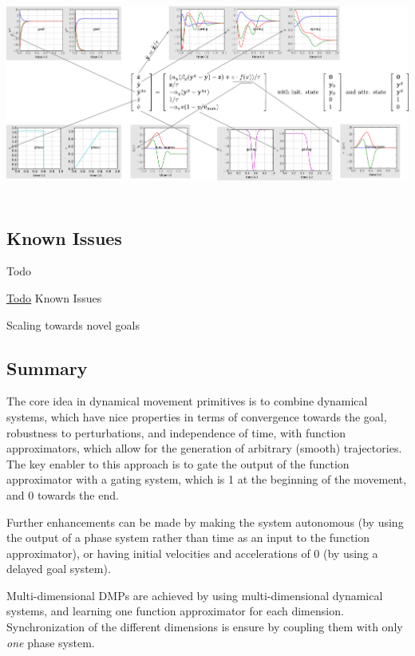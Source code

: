 \begin{DoxyImage}
\includegraphics[height=7cm]{dmpplot_kulvicius2012joining-svg}
\caption{The various dynamical systems and forcing terms in multi-\/dimensional D\+M\+Ps.}
\end{DoxyImage}
\hypertarget{page_dmp_sec_dmp_issues}{}\subsection{Known Issues}\label{page_dmp_sec_dmp_issues}
\begin{DoxyRefDesc}{Todo}
\item[\hyperlink{todo__todo000007}{Todo}]Known Issues\end{DoxyRefDesc}


\begin{DoxyItemize}
\item Scaling towards novel goals\end{DoxyItemize}
\hypertarget{page_dmp_sec_dmp_summary}{}\subsection{Summary}\label{page_dmp_sec_dmp_summary}
The core idea in dynamical movement primitives is to combine dynamical systems, which have nice properties in terms of convergence towards the goal, robustness to perturbations, and independence of time, with function approximators, which allow for the generation of arbitrary (smooth) trajectories. The key enabler to this approach is to gate the output of the function approximator with a gating system, which is 1 at the beginning of the movement, and 0 towards the end.

Further enhancements can be made by making the system autonomous (by using the output of a phase system rather than time as an input to the function approximator), or having initial velocities and accelerations of 0 (by using a delayed goal system).

Multi-\/dimensional D\+M\+Ps are achieved by using multi-\/dimensional dynamical systems, and learning one function approximator for each dimension. Synchronization of the different dimensions is ensure by coupling them with only {\itshape one} phase system. 